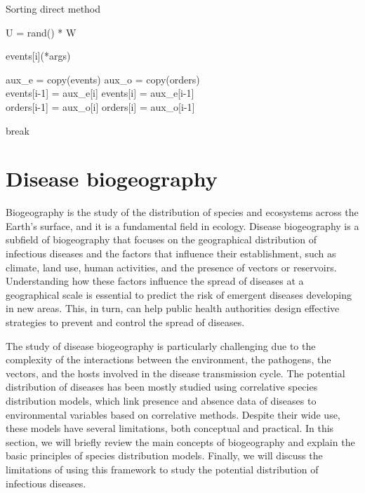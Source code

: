 \begin{algorithm}[H]
  \caption{Sorting direct method}
  \label{alg:Chose_apply_event}
  \begin{algorithmic}[1]

    \State U = rand() * W 

     


    \State events[i](*args) 

     

    \State aux\_e = copy(events)
    \State aux\_o = copy(orders)\\

    \State events[i-1] = aux\_e[i]
    \State events[i] = aux\_e[i-1]\\

    \State orders[i-1] = aux\_o[i]
    \State orders[i] = aux\_o[i-1]

    \EndIf

    \State break

    \EndIf

    \EndFor

  \end{algorithmic}
\end{algorithm}

\section{\label{sec:Disease biogeography} Disease biogeography}

Biogeography is the study of the distribution of species and ecosystems
across
the Earth's surface, and it is a fundamental field in ecology. Disease
biogeography is a subfield of biogeography that focuses on the geographical
distribution of infectious diseases and the factors that influence their
establishment, such as climate, land use, human activities, and the presence
of
vectors or reservoirs. Understanding how these factors influence the
spread of diseases at a geographical scale is essential to predict the
risk of emergent diseases developing in new areas. This, in turn, can help
public health authorities design effective strategies to prevent and
control
the spread of diseases.

The study of disease biogeography is particularly challenging due to the
complexity of the interactions between the environment, the pathogens, the
vectors, and the hosts involved in the disease transmission cycle. The
potential distribution of diseases has been mostly studied using correlative
species distribution models, which link presence and absence data of diseases
to environmental variables based on correlative methods. Despite their wide
use, these models have several limitations, both conceptual and practical. In
this section, we will briefly review the main concepts of biogeography and
explain the basic principles of species distribution models. Finally, we will
discuss the limitations of using this framework to study the potential
distribution of infectious diseases.

